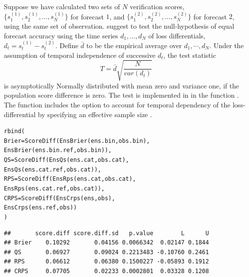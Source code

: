 \documentclass[article]{jss}\usepackage[]{graphicx}\usepackage[]{color}
\makeatletter
\newcommand{\hlstd}[1]{\textcolor[rgb]{0,0,0}{#1}}%
\newcommand{\hlkwc}[1]{\textcolor[rgb]{0,0.502,0.753}{#1}}%
\newcommand{\hlkwd}[1]{\textcolor[rgb]{0,0.267,0.4}{#1}}%
\newenvironment{kframe}{%
 \def\at@end@of@kframe{}%
 \ifinner\ifhmode%
  \def\at@end@of@kframe{\end{minipage}}%
  \begin{minipage}{\columnwidth}%
 \fi\fi%
 \def\FrameCommand##1{\hskip\@totalleftmargin \hskip-\fboxsep
 \colorbox{shadecolor}{##1}\hskip-\fboxsep
     \hskip-\linewidth \hskip-\@totalleftmargin \hskip\columnwidth}%
 \MakeFramed {\advance\hsize-\width
   \@totalleftmargin\z@ \linewidth\hsize
   \@setminipage}}%
 {\par\unskip\endMakeFramed%
 \at@end@of@kframe}
\newenvironment{knitrout}{}{} %
\makeatother
\begin{document}
Suppose we have calculated two sets of $N$ verification scores, $\{s^{(1)}_1, s^{(1)}_2, \dots, s^{(1)}_N\}$ for forecast $1$, and $\{s^{(2)}_1, s^{(2)}_2, \dots, s^{(2)}_N\}$ for forecast $2$, using the same set of observation.
\citet{diebold1995comparing} suggest to test the null-hypothesis of equal forecast accuracy using the time series $d_1, \dots, d_N$ of loss differentials, $d_t = s^{(1)}_t - s^{(2)}_t$. 
Define $\bar{d}$ to be the empirical average over $d_1,\cdots, d_N$.
Under the assumption of temporal independence of successive $d_t$, the test statistic 
%
\begin{equation}
T = \bar{d}\sqrt{\frac{N}{var(d_t)}}
\end{equation}
%
is asymptotically Normally distributed with mean zero and variance one, if the population score difference is zero.
The test is implemented in  in the function .
The function includes the option to account for temporal dependency of the loss-differential by specifying an effective sample size .
%
\begin{knitrout}
\color{fgcolor}\begin{kframe}
\begin{alltt}
\hlkwd{rbind}\hlstd{(}
  \hlkwc{Brier} \hlstd{=} \hlkwd{ScoreDiff}\hlstd{(}\hlkwd{EnsBrier}\hlstd{(ens.bin,     obs.bin),}
                    \hlkwd{EnsBrier}\hlstd{(ens.bin.ref, obs.bin)),}
  \hlkwc{QS}    \hlstd{=} \hlkwd{ScoreDiff}\hlstd{(}\hlkwd{EnsQs}\hlstd{(   ens.cat,     obs.cat),}
                    \hlkwd{EnsQs}\hlstd{(   ens.cat.ref, obs.cat)),}
  \hlkwc{RPS}   \hlstd{=} \hlkwd{ScoreDiff}\hlstd{(}\hlkwd{EnsRps}\hlstd{(  ens.cat,     obs.cat),}
                    \hlkwd{EnsRps}\hlstd{(  ens.cat.ref, obs.cat)),}
  \hlkwc{CRPS}  \hlstd{=} \hlkwd{ScoreDiff}\hlstd{(}\hlkwd{EnsCrps}\hlstd{( ens,         obs),}
                    \hlkwd{EnsCrps}\hlstd{( ens.ref,     obs))}
\hlstd{)}
\end{alltt}
\begin{verbatim}
##       score.diff score.diff.sd   p.value        L      U
## Brier    0.10292       0.04156 0.0066342  0.02147 0.1844
## QS       0.06927       0.09024 0.2213483 -0.10760 0.2461
## RPS      0.06612       0.06380 0.1500227 -0.05893 0.1912
## CRPS     0.07705       0.02233 0.0002801  0.03328 0.1208
\end{verbatim}
\end{kframe}
\end{knitrout}
\end{document}
